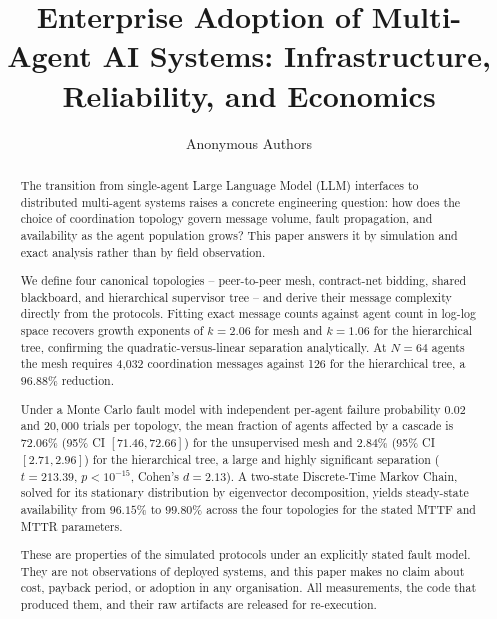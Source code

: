 \documentclass[11pt,a4paper]{article}
\begin{document}
\title{Enterprise Adoption of Multi-Agent AI Systems: Infrastructure, Reliability, and Economics}

\author{
Anonymous Authors
}

\maketitle

\begin{abstract}
The transition from single-agent Large Language Model (LLM) interfaces to distributed multi-agent systems raises a concrete engineering question: how does the choice of coordination topology govern message volume, fault propagation, and availability as the agent population grows? This paper answers it by simulation and exact analysis rather than by field observation.

We define four canonical topologies -- peer-to-peer mesh, contract-net bidding, shared blackboard, and hierarchical supervisor tree -- and derive their message complexity directly from the protocols. Fitting exact message counts against agent count in log-log space recovers growth exponents of $k = 2.06$ for mesh and $k = 1.06$ for the hierarchical tree, confirming the quadratic-versus-linear separation analytically. At $N = 64$ agents the mesh requires 4{,}032 coordination messages against 126 for the hierarchical tree, a $96.88\%$ reduction.

Under a Monte Carlo fault model with independent per-agent failure probability $0.02$ and $20{,}000$ trials per topology, the mean fraction of agents affected by a cascade is $72.06\%$ (95\% CI $[71.46, 72.66]$) for the unsupervised mesh and $2.84\%$ (95\% CI $[2.71, 2.96]$) for the hierarchical tree, a large and highly significant separation ($t = 213.39$, $p < 10^{-15}$, Cohen's $d = 2.13$). A two-state Discrete-Time Markov Chain, solved for its stationary distribution by eigenvector decomposition, yields steady-state availability from $96.15\%$ to $99.80\%$ across the four topologies for the stated MTTF and MTTR parameters.

These are properties of the simulated protocols under an explicitly stated fault model. They are not observations of deployed systems, and this paper makes no claim about cost, payback period, or adoption in any organisation. All measurements, the code that produced them, and their raw artifacts are released for re-execution.
\end{abstract}
\end{document}

